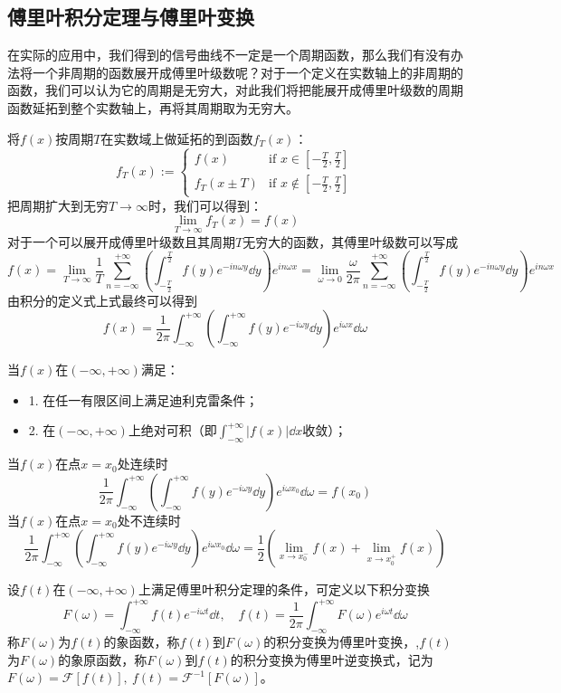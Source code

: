 \newpage
\subsection{傅里叶积分定理与傅里叶变换}
在实际的应用中，我们得到的信号曲线不一定是一个周期函数，那么我们有没有办法将一个非周期的函数展开成傅里叶级数呢？对于一个定义在实数轴上的非周期的函数，我们可以认为它的周期是无穷大，对此我们将把能展开成傅里叶级数的周期函数延拓到整个实数轴上，再将其周期取为无穷大。

将$f(x)$按周期$T$在实数域上做延拓的到函数$f_T(x)$：
\[ f_T(x) := \left\{
\begin{array}{rl}
f(x) & \text{if } x \in [-\frac{T}{2},\frac{T}{2}]\\
f_T(x \pm T) & \text{if } x \notin [-\frac{T}{2},\frac{T}{2}] 
\end{array} \right.\]
把周期扩大到无穷$T \rightarrow \infty$时，我们可以得到：
\[\lim_{T \rightarrow \infty}{f_T(x)=f(x)}\]
对于一个可以展开成傅里叶级数且其周期$T$无穷大的函数，其傅里叶级数可以写成
\[f(x)=\lim_{T \rightarrow \infty}\frac{1}{T}\sum_{n=-\infty}^{+\infty}(\int_{-\frac{T}{2}}^{\frac{T}{2}}f(y)e^{-in\omega y}\dd{y})e^{in\omega x}=\lim_{\omega \rightarrow 0}\frac{\omega}{2\pi}\sum_{n=-\infty}^{+\infty}(\int_{-\frac{T}{2}}^{\frac{T}{2}}f(y)e^{-in\omega y}\dd{y})e^{in\omega x}\]
由积分的定义式上式最终可以得到
\[f(x)=\frac{1}{2\pi}\int_{-\infty}^{+\infty}(\int_{-\infty}^{+\infty}f(y)e^{-i\omega y}\dd{y})e^{i\omega x}\dd{\omega}\]
\begin{theorem}[傅里叶积分公式]
当$f(x)$在${(-\infty,+\infty)}$满足：
\begin{itemize}
    \item 1. 在任一有限区间上满足迪利克雷条件；
    \item 2. 在${(-\infty,+\infty)}$上绝对可积（即$\int_{-\infty}^{+\infty}|f(x)|\dd{x}$收敛）；
\end{itemize}
当$f(x)$在点$x=x_0$处连续时
\[\frac{1}{2\pi}\int_{-\infty}^{+\infty}(\int_{-\infty}^{+\infty}f(y)e^{-i\omega y}\dd{y})e^{i\omega x_0}\dd{\omega}=f(x_0)\]
当$f(x)$在点$x=x_0$处不连续时
\[\frac{1}{2\pi}\int_{-\infty}^{+\infty}(\int_{-\infty}^{+\infty}f(y)e^{-i\omega y}\dd{y})e^{i\omega x_0}\dd{\omega}=\frac{1}{2}\left ( \lim_{x \rightarrow x_0^-}{f(x)}+\lim_{x \rightarrow x_0^+}{f(x)} \right )\]
\end{theorem}
\begin{definition}[傅里叶变换与傅里叶逆变换]
设$f(t)$在${(-\infty,+\infty)}$上满足傅里叶积分定理的条件，可定义以下积分变换
\[F(\omega)=\int_{-\infty}^{+\infty}f(t)e^{-i\omega t}\dd{t}, \quad f(t)=\frac{1}{2\pi}\int_{-\infty}^{+\infty}F(\omega)e^{i\omega t}\dd{\omega}\]
称$F(\omega)$为$f(t)$的象函数，称$f(t)$到$F(\omega)$的积分变换为傅里叶变换，,$f(t)$为$F(\omega)$的象原函数，称$F(\omega)$到$f(t)$的积分变换为傅里叶逆变换式，记为$F(\omega)=\mathcal{F}[f(t)], \ f(t)=\mathcal{F}^{-1}[F(\omega)]$。
\end{definition}
